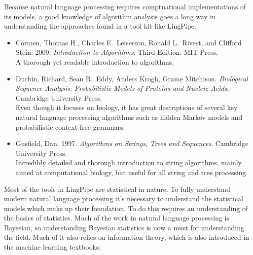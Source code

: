 
\noindent
Because natural language processing requires comptuational
implementations of its models, a good knowledge of algorithm analysis
goes a long way in understanding the approaches found in a tool kit
like LingPipe.

\begin{itemize}
%
\item
Cormen, Thomas H., Charles E.\ Leiserson, Ronald L.\ Rivest, and
Clifford Stein. 
2009.
{\it Introduciton to Algorithms}, Third Edition.
MIT Press.
\\
{\footnotesize A thorough yet readable introduction to algorithms.}
%
\item
Durbin, Richard, Sean R.\ Eddy, Anders Krogh, Grame Mitchison.
{\it Biological Sequence Analysis: Probabilistic Models of Proteins
and Nucleic Acids}.
Cambridge University Press.
\\
{\footnotesize Even though it focuses on biology, it has great
descriptions of several key natural language processing algorithms
such as hidden Markov models and probabilistic context-free grammars.}
%
\item
Gusfield, Dan.
1997.
{\it Algorithms on Strings, Trees and Sequences}.
Cambridge University Press.
\\
{\footnotesize Incredibly detailed and thorough introduction to
string algorithms, mainly aimed at computational biology, but
useful for all string and tree processing.}
%
\end{itemize}







\noindent
Most of the tools in LingPipe are statistical in nature.  To fully
understand modern natural language processing it's necessary to
understand the statistical models which make up their foundation.
To do this requires an understanding of the basics of statistics.
Much of the work in natural language processing is Bayesian, so
understanding Bayesian statistics is now a must for understanding
the field.  Much of it also relies on information theory, which is
also introduced in the machine learning textbooks.

